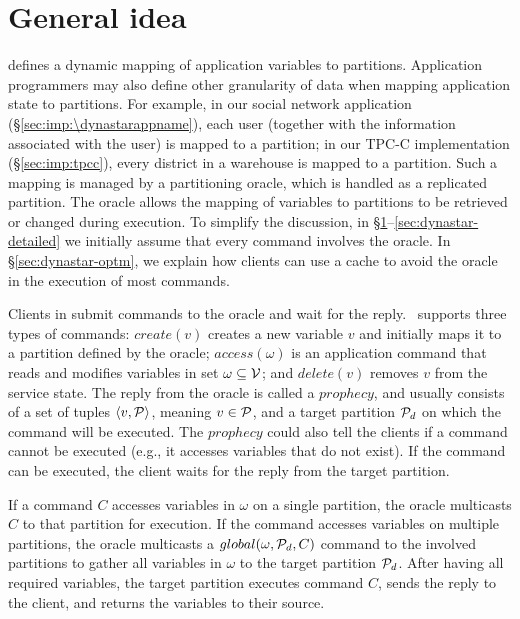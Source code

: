 \section{General idea}
\label{sec:dynastar-idea}

\dynastar defines a dynamic mapping of application variables to partitions.
Application programmers may also define other granularity of data when mapping
application state to partitions. For example, in our social network application
(\S\ref{sec:imp:\dynastarappname}), each user (together with the information associated
with the user) is mapped to a partition; in our TPC-C implementation
(\S\ref{sec:imp:tpcc}), every district in a warehouse is mapped to a partition.
Such a mapping is managed by a partitioning oracle, which is handled as a
replicated partition. The oracle allows the mapping of variables to partitions
to be retrieved or changed during execution. To simplify the discussion, in
\S\ref{sec:dynastar-idea}--\ref{sec:dynastar-detailed} we initially assume
that every command involves the oracle. In \S\ref{sec:dynastar-optm}, we explain how
clients can use a cache to avoid the oracle in the execution of most commands.

Clients in \dynastar submit commands to the oracle and wait for the reply.
\dynastar\ supports three types of commands: $create(v)$ creates a new variable
$v$ and initially maps it to a partition defined by the oracle; $access(\omega)$
is an application command that reads and modifies variables in set $\omega
\subseteq \mathcal{V}$; and $delete(v)$ removes $v$ from the service state. The reply
from the oracle is called a $prophecy$, and usually consists of a set of tuples
$\langle v, \mathcal{P} \rangle$, meaning $v \in \mathcal{P}$, and a target partition $\mathcal{P}_d$
on which the command will be executed. The $prophecy$ could also tell the
clients if a command cannot be executed (e.g., it accesses variables that do not
exist). If the command can be executed, the client waits for the reply from the
target partition.

If a command $C$ accesses variables in $\omega$ on a single partition, the
oracle multicasts $C$ to that partition for execution. If the command accesses
variables on multiple partitions, the oracle multicasts a $global(\omega,\mathcal{P}_d,
C)$ command to the involved partitions to gather all variables in $\omega$ to
the target partition $\mathcal{P}_d$. After having all required variables, the target
partition executes command $C$, sends the reply to the client, and returns the
variables to their source.

